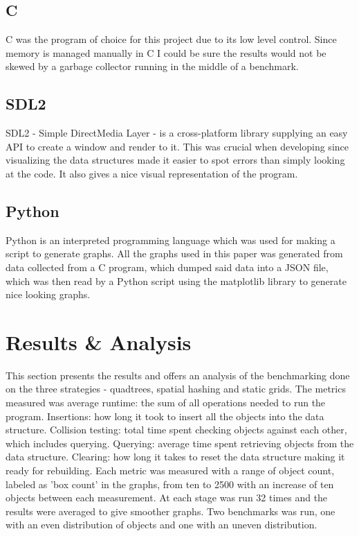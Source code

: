 \documentclass[a4paper, 12pt]{article}
\begin{document}
\subsection{C}
C was the program of choice for this project due to its low level control.
Since memory is managed manually in C I could be sure the results would not be
skewed by a garbage collector running in the middle of a benchmark.

\subsection{SDL2}
SDL2 - Simple DirectMedia Layer - is a cross-platform library supplying an easy
API to create a window and render to it. This was crucial when developing since
visualizing the data structures made it easier to spot errors than simply
looking at the code. It also gives a nice visual representation of the program.

\subsection{Python}
Python is an interpreted programming language which was used for making a script
to generate graphs. All the graphs used in this paper was generated from data
collected from a C program, which dumped said data into a JSON file, which was
then read by a Python script using the matplotlib library to generate nice
looking graphs.

\newpage

\section{Results \& Analysis}
This section presents the results and offers an analysis of the benchmarking
done on the three strategies - quadtrees, spatial hashing and static grids. The
metrics measured was average runtime: the sum of all operations needed to run
the program. Insertions: how long it took to insert all the objects into the
data structure. Collision testing: total time spent checking objects against
each other, which includes querying. Querying: average time spent retrieving
objects from the data structure. Clearing: how long it takes to reset the data
structure making it ready for rebuilding. Each metric was measured with a range
of object count, labeled as 'box count' in the graphs, from ten to 2500 with an
increase of ten objects between each measurement. At each stage was run 32 times
and the results were averaged to give smoother graphs. Two benchmarks was run,
one with an even distribution of objects and one with an uneven distribution.
\end{document}
